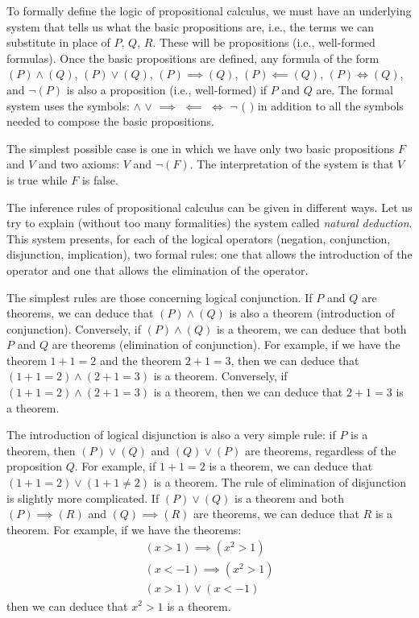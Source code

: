 To formally define the logic of propositional calculus, we must have an
underlying system that tells us what the basic propositions are, i.e., the terms
we can substitute in place of $P$, $Q$, $R$. These will be propositions (i.e.,
well-formed formulas). Once the basic propositions are defined, any formula of
the form $(P)\land(Q)$, $(P)\lor(Q)$, $(P)\implies(Q)$, $(P)\impliedby (Q)$,
$(P)\Leftrightarrow(Q)$, and $\lnot(P)$ is also a proposition (i.e.,
well-formed) if $P$ and $Q$ are. The formal system uses the symbols: $\land$
$\lor$ $\implies$ $\impliedby$ $\Leftrightarrow$ $\lnot$ $($ $)$ in addition to
all the symbols needed to compose the basic propositions.

The simplest possible case is one in which we have only two basic propositions
$F$ and $V$ and two axioms: $V$ and $\lnot (F)$. The interpretation of the
system is that $V$ is true while $F$ is false.

The inference rules of propositional calculus can be given in different ways. 
%
%
Let us try to explain (without too many formalities) the system called
\emph{natural deduction}. This system presents, for each of the logical
operators (negation, conjunction, disjunction, implication), two formal rules:
one that allows the introduction of the operator and one that allows the
elimination of the operator.

The simplest rules are those concerning logical conjunction. If $P$ and $Q$ are
theorems, we can deduce that $(P)\land (Q)$ is also a theorem (introduction of
conjunction).
%
%
%
Conversely, if $(P)\land (Q)$ is a theorem, we can deduce that both $P$ and $Q$
are theorems (elimination of conjunction).
%
%
For example, if we have the theorem $1+1=2$ and the theorem $2+1=3$, then we can
deduce that $(1+1=2) \land (2+1=3)$ is a theorem. Conversely, if $(1+1=2)\land
(2+1=3)$ is a theorem, then we can deduce that $2+1=3$ is a theorem.

The introduction of logical disjunction is also a very simple rule: if $P$ is a
theorem, then $(P)\lor (Q)$ and $(Q)\lor (P)$ are theorems, regardless of the
proposition $Q$.
%
%
For example, if $1+1=2$ is a theorem, we can deduce that $(1+1=2) \lor (1+1\neq
2)$ is a theorem. The rule of elimination of disjunction is slightly more
complicated. If $(P)\lor (Q)$ is a theorem and both $(P)\implies (R)$ and
$(Q)\implies (R)$ are theorems, we can deduce that $R$ is a theorem.
%
For example, if we have the theorems: 
\[
\begin{gathered}
  (x>1) \implies (x^2>1)\\ 
  (x<-1) \implies (x^2>1)\\  
  (x>1) \lor (x<-1)
\end{gathered}
\]
then we can deduce that $x^2>1$ is a theorem.

